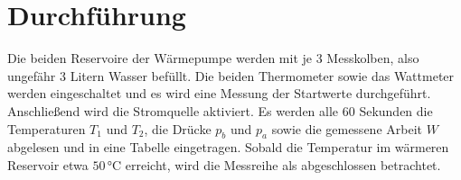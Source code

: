 \section{Durchführung}
\label{sec:Durchführung}
Die beiden Reservoire der Wärmepumpe werden mit je 3 Messkolben, also ungefähr 3 Litern Wasser befüllt. Die beiden Thermometer sowie das Wattmeter werden eingeschaltet und es wird eine Messung der Startwerte durchgeführt.
Anschließend wird die Stromquelle aktiviert. Es werden alle 60 Sekunden die Temperaturen $T_1$ und $T_2$, die Drücke $p_b$ und $p_a$ sowie die gemessene Arbeit $W$ abgelesen und in eine Tabelle eingetragen. Sobald die
Temperatur im wärmeren Reservoir etwa $50\, \unit{\celsius}$ erreicht, wird die Messreihe als abgeschlossen betrachtet.

